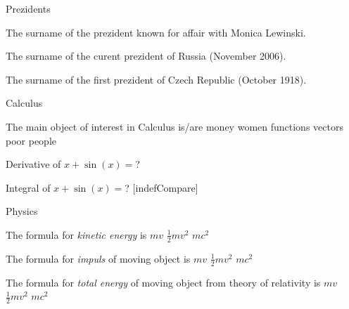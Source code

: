 \documentclass{article}
\begin{document}
\def\title{My Jeopardy}


\MakeGameBoard

\begin{category}{Prezidents}
  \begin{question}
    The surname of the prezident known for affair with Monica Lewinski.
  \end{question}
  \begin{question}
    The surname of the curent prezident of Russia (November 2006).
  \end{question}
  \begin{question}
    The surname of the first prezident of Czech Republic (October 1918).
  \end{question}
\end{category}
\begin{category}{Calculus}
  \begin{question}
    The main object of interest in Calculus is/are
     money
     women
     functions
     vectors
     poor people
  \end{question}
  \begin{question}
    Derivative of $x+\sin(x)=$?
  \end{question}
  \begin{question}
    Integral of $x+\sin(x)=$?
    [indefCompare]
  \end{question}
\end{category}
\begin{category}{Physics}
  \begin{question}
    The formula for \textit{kinetic energy} is
     $ mv$
     $\frac 12 mv^2$
     $mc^2$
  \end{question}
  \begin{question}
    The formula for \textit{impuls} of moving object is
     $ mv$
     $\frac 12 mv^2$
     $mc^2$
  \end{question}
  \begin{question}
    The formula for \textit{total energy} of moving object from theory
    of relativity is 
     $ mv$ 
     $\frac 12 mv^2$ 
     $mc^2$
  \end{question}
\end{category}
\end{document}
